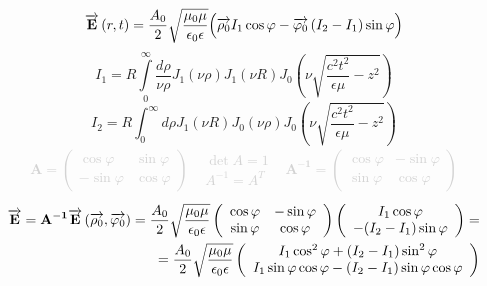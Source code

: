 %
\begin{equation}
\overrightarrow{\mathbf E} \left( r, t \right) = \frac{A_0}{2} 
\sqrt{\frac{\mu_0 \mu}{\epsilon_0 \epsilon}}
\Big( \overrightarrow{\mathbf \rho_0} I_1 \cos \varphi - 
\overrightarrow{\mathbf  \varphi_0 } \left( I_2 - I_1 \right) \sin \varphi \Big)
\end{equation}
%
\begin{equation*}
I_1 = R \int \limits_{0}^{\infty} \frac{d \rho}{\nu \rho} J_1 (\nu \rho) 
J_1 (\nu R) J_0 \left( \nu \sqrt{\frac{c^2 t^2}{\epsilon \mu} - z^2} \right)
\end{equation*}
%
\begin{equation*}
I_2 = R \int_{0}^{\infty} d \rho J_1 (\nu R) 
J_0 (\nu \rho) J_0 \left( \nu \sqrt{\frac{c^2 t^2}{\epsilon \mu} - z^2} \right)
\end{equation*}
%
\textcolor{lightgray} { \begin{equation*} \begin{aligned}
\mathbf{A} = \left( \begin{array}{cc}
\cos \varphi & \sin \varphi \\
- \sin \varphi & \cos \varphi
\end{array} \right) \begin{array}{ccc}
	& \det A = 1 		&	\\
	& A^{-1} = A^{T}	&
\end{array} 
\mathbf{A^{-1}} = \left( \begin{array}{cc}
\cos \varphi & - \sin \varphi \\
\sin \varphi & \cos \varphi
\end{array} \right) 
\end{aligned} \end{equation*} }
%
\textcolor{lightgray} { \begin{equation*} \begin{aligned}
\overrightarrow{\mathbf E} = 
\mathbf{A^{-1}} \overrightarrow{\mathbf E} \left( \overrightarrow{\mathbf \rho_0}, \overrightarrow{\mathbf \varphi_0} \right) = 
\frac{A_0}{2} \sqrt{\frac{\mu_0 \mu}{\epsilon_0 \epsilon}}
\left( \begin{array}{cc} \cos \varphi & - \sin \varphi \\
\sin \varphi & \cos \varphi \end{array} \right)
\left( \begin{array}{c} I_1 \cos \varphi \\
- (I_2 - I_1) \sin \varphi \end{array} \right) = \\
= \frac{A_0}{2} \sqrt{\frac{\mu_0 \mu}{\epsilon_0 \epsilon}}
\left( \begin{array}{c} I_1 \cos^2 \varphi + (I_2 - I_1) \sin^2 \varphi \\
I_1 \sin \varphi \cos \varphi - (I_2 - I_1) 
\sin \varphi \cos \varphi \end{array} \right)
\end{aligned} \end{equation*} }
